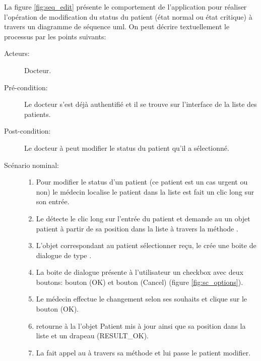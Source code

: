 La figure \ref{fig:seq_edit} présente le comportement de l'application pour réaliser l'opération de modification du status du patient (état normal ou état critique) à travers un diagramme de séquence \gls{uml}. On peut décrire textuellement le processus par les points suivants:

\begin{description}

\item[Acteurs:] Docteur.

\item[Pré-condition:] Le docteur s'est déjà authentifié et il se trouve sur l'interface de la liste des patients.

\item[Post-condition:] Le docteur à peut modifier le status du patient qu'il a sélectionné.

\item[Scénario nominal:]

\begin{enumerate}

\item Pour modifier le status d'un patient (ce patient est un cas urgent ou non) le médecin localise le patient dans la liste est fait un clic long sur son entrée.

\item Le  détecte le clic long sur l'entrée du patient et demande au  un objet patient à partir de sa position dans la liste à travers la méthode .

\item L'objet  correspondant au patient sélectionner reçu, le  crée une boite de dialogue de type .

\item La boite de dialogue  présente à l'utilisateur un checkbox avec deux boutons: bouton (OK) et bouton (Cancel) (figure \ref{fig:sc_options}).

\item Le médecin effectue le changement selon ses souhaits et clique sur le bouton (OK).\label{item:alt}

\item {} retourne à la  l'objet Patient
mis à jour ainsi que sa position dans la liste et un drapeau
(RESULT\_OK).

\item La  fait appel au  à travers sa méthode  et lui passe le patient modifier.


\end{enumerate}
\end{description}

